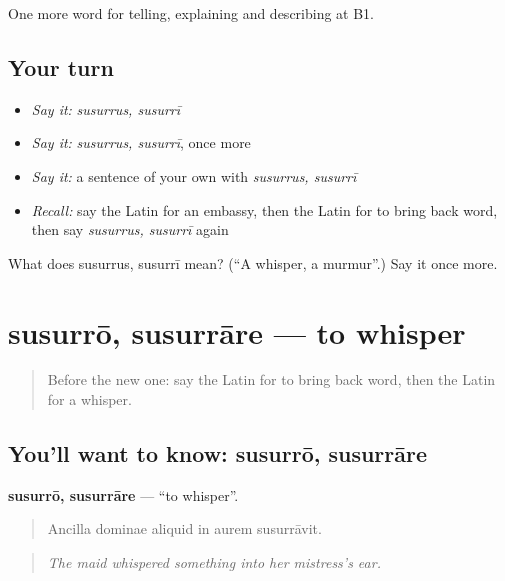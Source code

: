\begin{grammarlens}[title={What you've built}]
One more word for telling, explaining and describing at B1.
\end{grammarlens}

\subsection*{Your turn}
\begin{itemize}
\raggedright
  \item \emph{Say it:} \emph{susurrus, susurrī}
  \item \emph{Say it:} \emph{susurrus, susurrī}, once more
  \item \emph{Say it:} a sentence of your own with \emph{susurrus, susurrī}
  \item \emph{Recall:} say the Latin for an embassy, then the Latin for to bring back word, then say \emph{susurrus, susurrī} again
\end{itemize}

\begin{tcolorbox}[breakable,colback=teal!4,colframe=teal!35!black,title={Before you move on}]
What does susurrus, susurrī mean? (\textquotedblleft{}A whisper, a murmur\textquotedblright{}.) Say it once more.
\end{tcolorbox}
\section[susurrō, susurrāre]{susurrō, susurrāre — to whisper}

\label{lesson:LA-C301-susurro}



\begin{quote}
Before the new one: say the Latin for to bring back word, then the Latin for a whisper.
\end{quote}

\subsection*{You'll want to know: susurrō, susurrāre}
\textbf{susurrō, susurrāre} — \textquotedblleft{}to whisper\textquotedblright{}.

\begin{quote}
Ancilla dominae aliquid in aurem susurrāvit.
\end{quote}

\begin{quote}
\emph{The maid whispered something into her mistress's ear.}
\end{quote}

